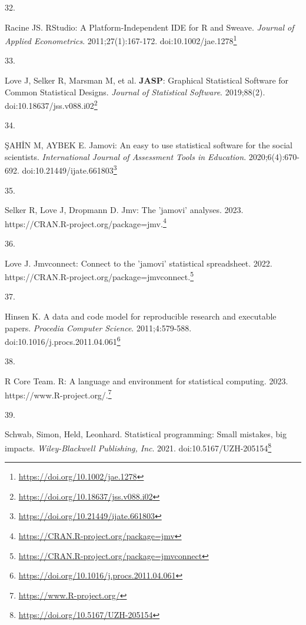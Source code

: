 \documentclass[
  a4paper,
]{book}
\newlength{\cslhangindent}
\newlength{\csllabelwidth}
\newlength{\cslentryspacingunit} %
\newenvironment{CSLReferences}[2] %
 {%
  \setlength{\parindent}{0pt}
  \ifodd #1
  \let\oldpar\par
  \def\par{\hangindent=\cslhangindent\oldpar}
  \fi
  \setlength{\parskip}{#2\cslentryspacingunit}
 }%
 {}
\newcommand{\CSLLeftMargin}[1]{\parbox[t]{\csllabelwidth}{#1}}
\newcommand{\CSLRightInline}[1]{\parbox[t]{\linewidth - \csllabelwidth}{#1}\break}
\renewcommand{\href}[2]{#2\footnote{\url{#1}}}
\begin{document}
\begin{CSLReferences}{0}{0}
\leavevmode{}%
\CSLLeftMargin{32. }%
\CSLRightInline{Racine JS. RStudio: A Platform{-}Independent IDE for R and Sweave. \emph{Journal of Applied Econometrics}. 2011;27(1):167-172. doi:\href{https://doi.org/10.1002/jae.1278}{10.1002/jae.1278}}

\leavevmode{}%
\CSLLeftMargin{33. }%
\CSLRightInline{Love J, Selker R, Marsman M, et al. {\textbf{JASP}}: Graphical Statistical Software for Common Statistical Designs. \emph{Journal of Statistical Software}. 2019;88(2). doi:\href{https://doi.org/10.18637/jss.v088.i02}{10.18637/jss.v088.i02}}

\leavevmode{}%
\CSLLeftMargin{34. }%
\CSLRightInline{ŞAHİN M, AYBEK E. Jamovi: An easy to use statistical software for the social scientists. \emph{International Journal of Assessment Tools in Education}. 2020;6(4):670-692. doi:\href{https://doi.org/10.21449/ijate.661803}{10.21449/ijate.661803}}

\leavevmode{}%
\CSLLeftMargin{35. }%
\CSLRightInline{Selker R, Love J, Dropmann D. Jmv: The 'jamovi' analyses. 2023. \href{https://CRAN.R-project.org/package=jmv}{https://CRAN.R-project.org/package=jmv.}}

\leavevmode{}%
\CSLLeftMargin{36. }%
\CSLRightInline{Love J. Jmvconnect: Connect to the 'jamovi' statistical spreadsheet. 2022. \href{https://CRAN.R-project.org/package=jmvconnect}{https://CRAN.R-project.org/package=jmvconnect.}}

\leavevmode{}%
\CSLLeftMargin{37. }%
\CSLRightInline{Hinsen K. A data and code model for reproducible research and executable papers. \emph{Procedia Computer Science}. 2011;4:579-588. doi:\href{https://doi.org/10.1016/j.procs.2011.04.061}{10.1016/j.procs.2011.04.061}}

\leavevmode{}%
\CSLLeftMargin{38. }%
\CSLRightInline{R Core Team. R: A language and environment for statistical computing. 2023. \href{https://www.R-project.org/}{https://www.R-project.org/.}}

\leavevmode{}%
\CSLLeftMargin{39. }%
\CSLRightInline{Schwab, Simon, Held, Leonhard. Statistical programming: Small mistakes, big impacts. \emph{Wiley-Blackwell Publishing, Inc}. 2021. doi:\href{https://doi.org/10.5167/UZH-205154}{10.5167/UZH-205154}}


\end{CSLReferences}
\end{document}
